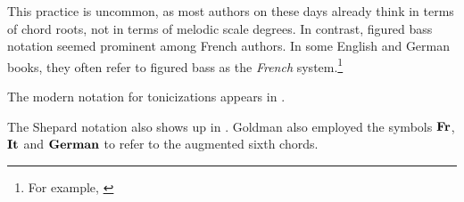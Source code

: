 
This practice is uncommon, as most authors on these days already think in terms of chord roots, not in terms of melodic scale degrees.
In contrast, figured bass notation seemed prominent among French authors.
In some English and German books, they often refer to figured bass as the \emph{French} system.\footnote{For example, \textcite{norris1894practical}}

The modern notation for tonicizations appears in \textcite{tischler1964practical}.

The Shepard notation also shows up in \textcite{goldman1965harmony}.
Goldman also employed the symbols $\textbf{Fr}\relax\relax$, $\textbf{It}\relax\relax$ and $\textbf{German}\relax\relax$ to refer to the augmented sixth chords.
